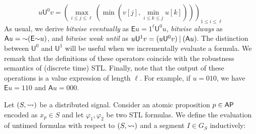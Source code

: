 \small
\[ u \mathsf{U}^0 v = \left( \max_{i \leq j \leq \ell} \left( \min \left( v[j], \min_{i \leq k \leq j} u[k] \right) \right) \right)_{1 \leq i \leq \ell} \]
\normalsize
%
As usual, we derive \emph{bitwise eventually} as 
$\mathsf{E} u = 1^\ell \mathsf{U}^0 u$, \emph{bitwise always} as $\mathsf{A} u = \mathord{\sim} 
(\mathsf{E} \mathord{\sim} u)$, and \emph{bitwise weak until} as $u \mathsf{U}^1 v = (u \mathsf{U}^0 v) 
\mathbin{|} (\mathsf{A} u)$.
The distinction between $\mathsf{U}^0$ and $\mathsf{U}^1$ will be useful when we incrementally evaluate a formula.
We remark that the definitions of these operators coincide with the robustness semantics of (discrete time) STL.
Finally, note that the output of these operations is a value expression of length $\ell$.
For example, if $u = 010$, we have $\mathsf{E} u = 110$ and $\mathsf{A} u = 000$.


Let  $(S, {\rightsquigarrow})$ be a distributed signal.
Consider an atomic proposition $p \in \mathsf{AP}$ encoded as $x_p \in S$ and let $\varphi_1, \varphi_2$ be two STL formulas.
We define the evaluation of untimed formulas with respect to $(S, {\rightsquigarrow})$ and a segment $I \in G_S$ inductively:

